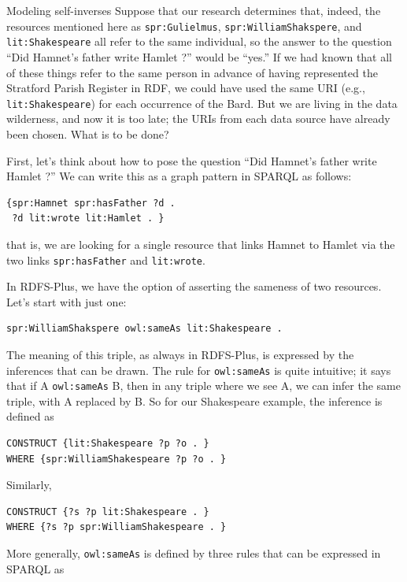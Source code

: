 \begin{challenge}{Modeling self-inverses}
Suppose that our research determines that, indeed, the resources
mentioned here as \texttt{spr:Gulielmus}, \texttt{spr:WilliamShakspere}, and
\texttt{lit:Shakespeare} all refer to the same individual, so the answer to the
question ``Did Hamnet's father write Hamlet ?'' would be ``yes.'' If we
had known that all of these things refer to the same person in advance
of having represented the Stratford Parish Register in RDF, we could
have used the same URI (e.g., \texttt{lit:Shakespeare}) for
each occurrence of the Bard. But we are living in the data wilderness,
and now it is too late; the URIs from each data source have already been
chosen. What is to be done?

First, let's think about how to pose the question ``Did Hamnet's father
write Hamlet ?'' We can write this as a graph pattern in SPARQL as
follows:

\begin{lstlisting}
{spr:Hamnet spr:hasFather ?d .
 ?d lit:wrote lit:Hamlet . }
\end{lstlisting}

that is, we are looking for a single resource that links Hamnet to
Hamlet via the two links
\texttt{spr:hasFather} and \texttt{lit:wrote}.


In RDFS-Plus, we have the option of asserting the sameness of two
resources. Let's start with just one:

\begin{lstlisting}
spr:WilliamShakspere owl:sameAs lit:Shakespeare .
\end{lstlisting}

The meaning of this triple, as always in RDFS-Plus, is expressed by the
inferences that can be drawn. The rule for \texttt{owl:sameAs} is quite
intuitive; it says that if A \texttt{owl:sameAs} B, then in any triple where we
see A, we can infer the same triple, with A replaced by B. So for our
Shakespeare example, the inference is defined as

\begin{lstlisting}
CONSTRUCT {lit:Shakespeare ?p ?o . }
WHERE {spr:WilliamShakespeare ?p ?o . }
\end{lstlisting}

Similarly,

\begin{lstlisting}
CONSTRUCT {?s ?p lit:Shakespeare . }
WHERE {?s ?p spr:WilliamShakespeare . }
\end{lstlisting}

More generally, \texttt{owl:sameAs} is defined by three rules that can be
expressed in SPARQL as


\end{challenge}
